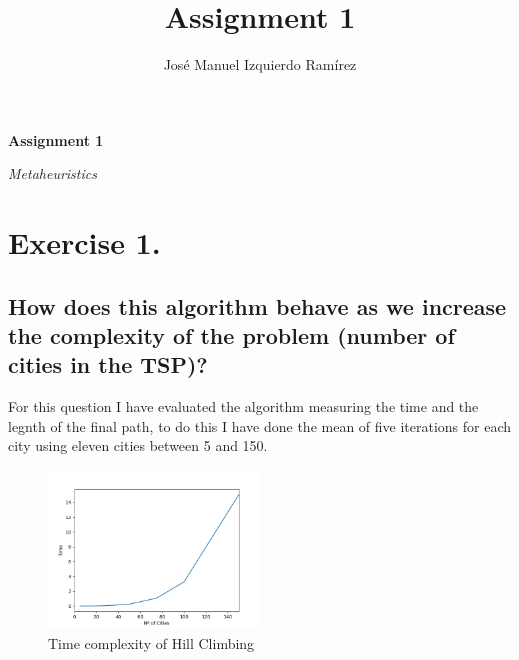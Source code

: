 \documentclass{article}
\title{Assignment 1}
\author{José Manuel Izquierdo Ramírez}
\begin{document}
    \begin{titlepage}
        
        \centering
        {\LARGE\bfseries Assignment 1\par}
        \vspace{0,5cm}
        {\itshape\Large Metaheuristics \par}
        \vspace{0,5cm}        


    \end{titlepage}
    
    \begin{index}
        \tableofcontents
        \listoffigures
    \end{index}

    \newpage
    
    \section{Exercise 1.}
    \subsection{How does this algorithm behave as we increase the complexity of the problem (number of cities in the TSP)?}

        For this question I have evaluated the algorithm measuring the time and the legnth of the final path, to do this I 
        have done the mean of five iterations for each city using eleven cities between 5 and 150.

        \begin{figure}[H]

            \centering
            \includegraphics[width=0.5\textwidth]{../media/01.TSP-cities-time.png}
            \caption{Time complexity of Hill Climbing}
            \label{Time complexity of Hill Climbing}

        \end{figure}
\end{document}
